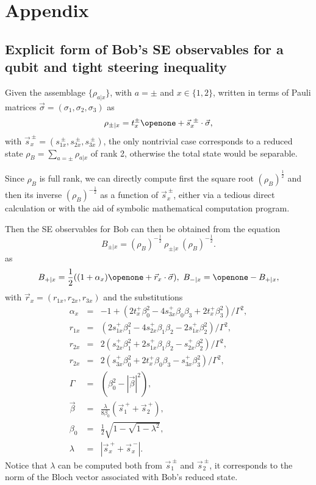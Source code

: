 \documentclass[10pt,twocolumn,aps,prl,nobibnotes,showpacs,superscriptaddress,floatfix]{revtex4-1}
\theoremstyle{definition}
\begin{document}
\appendix 
\section{Appendix}

\subsection{Explicit form of Bob's SE observables for a qubit and tight steering inequality}
Given the assemblage $\{\rho_{a|x}\}$, with $a=\pm $ and $x\in\{1,2\}$, written in terms of Pauli matrices $\vec\sigma=(\sigma_1,\sigma_2,\sigma_3)$ as
\begin{equation}
\rho_{\pm|x}= t^\pm_x \openone + \vec s^{\ \pm}_x \cdot \vec\sigma,
\end{equation}
with $\vec s_x^{\ \pm}=(s_{1x}^{\ \pm},s_{2x}^{\ \pm},s_{3x}^{\ \pm})$, the only nontrivial case corresponds to a reduced state $\rho_B=\sum_{a=\pm} \rho_{a|x}$ of rank 2, otherwise the total state would be separable. 

Since $\rho_B$ is full rank, we can directly compute first the square root $(\rho_B)^{\frac{1}{2}}$ and then its inverse $(\rho_B)^{-\frac{1}{2}}$ as a function of $\vec s_x^{\ \pm}$, either via a tedious direct calculation or with the aid of symbolic mathematical computation program.

Then the SE observables for Bob can then be obtained from the equation
\begin{equation}\label{bobobssm}
B_{\pm|x} = ({\rho}_B)^{-\frac{1}{2}}\ {\rho}_{\pm|x}\ ({\rho}_B)^{-\frac{1}{2}}.
\end{equation}
as
\begin{equation}\label{bobqubit}
B_{+|x}=\frac{1}{2}((1+\alpha_x)\openone+\vec r_x\cdot\vec\sigma),\   B_{-|x}=\openone - B_{+|x},
\end{equation}
with $\vec r_x=(r_{1x},r_{2x},r_{3x})$ and the substitutions
\begin{eqnarray}
\alpha_x &=& -1 + (2t^+_x \beta_0^2 -4 s_{3x}^{+} \beta_0 \beta_3 + 2t^+ _x\beta_3^2)/\Gamma^2,\\
r_{1x} &=& (2 s_{1x}^+\beta_1^2-4 s_{2x}^+\beta_1 \beta_2-2 s_{1x}^+ \beta_2^2)/\Gamma^2,\\
r_{2x} &=& 2(s_{2x}^+ \beta_1^2 + 2 s_{1x}^+ \beta_1 \beta_2 - s_{2x}^+ \beta_2^2)/\Gamma^2,\\
r_{2x} &=& 2(s_{3x}^+ \beta_0^2 + 2 t_{x}^+ \beta_0 \beta_3 - s_{3x}^+ \beta_3^2)/\Gamma^2,\\
\Gamma &=& (\beta_0^2 -|\vec{\beta}|^2),\\ 
\vec \beta &=& \frac{\lambda}{8\beta_0} (\vec s_{1}^{\ +} + \vec s_{2}^{\ +}),\\
\beta_0 &=& \frac{1}{2} \sqrt{ 1 - \sqrt{1-\lambda^2}},\\ 
\lambda &=& | \vec s_x^{\ +} + \vec s_x^{\ -}|.
\end{eqnarray}
Notice that $\lambda$ can be computed both from $\vec s_1^{\ \pm}$ and $\vec s_2^{\ \pm}$, it corresponds to the norm of the Bloch vector associated with Bob's reduced state. 
\end{document}
